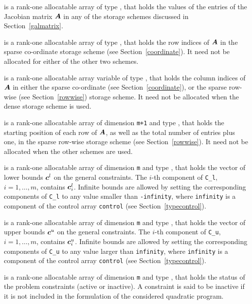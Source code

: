 \documentclass{galahad}
\begin{document}
\begin{description}
\begin{description}
 is a rank-one allocatable array of type \realdp, that holds
the values of the entries of the Jacobian matrix ${\bm{A}}$ in any of the
storage schemes discussed in Section~\ref{galmatrix}.

 is a rank-one allocatable array of type \integer,
that holds the row indices of ${\bm{A}}$ in the sparse co-ordinate storage
scheme (see Section~\ref{coordinate}).
It need not be allocated for either of the other two schemes.

 is a rank-one allocatable array variable of type \integer,
that holds the column indices of ${\bm{A}}$ in either the sparse co-ordinate
(see Section~\ref{coordinate}), or the sparse row-wise
(see Section~\ref{rowwise}) storage scheme.
It need not be allocated when the dense storage scheme is used.

 is a rank-one allocatable array of dimension {\tt m+1} and type
\integer, that holds the
starting position of each row of ${\bm{A}}$, as well
as the total number of entries plus one, in the sparse row-wise storage
scheme (see Section~\ref{rowwise}). It need not be allocated when the
other schemes are used.

\end{description}

 is a rank-one allocatable array of dimension {\tt m} and type
\realdp, that holds the vector of lower bounds ${\bm{c}}^{l}$
on the general constraints. The $i$-th component of
{\tt C\_l}, $i = 1, \ldots , m$, contains ${\bm{c}}_{i}^{l}$.
Infinite bounds are allowed by setting the corresponding
components of {\tt C\_l} to any value smaller than {\tt -infinity},
where {\tt infinity} is a component of the control array {\tt control}
(see Section~\ref{typecontrol}).

 is a rank-one allocatable array of dimension {\tt m} and type
\realdp, that holds the vector of upper bounds ${\bm{c}}^{u}$
on the general constraints. The $i$-th component of
{\tt C\_u}, $i = 1,  \ldots ,  m$, contains ${\bm{c}}_{i}^{u}$.
Infinite bounds are allowed by setting the corresponding
components of {\tt C\_u} to any value larger than {\tt infinity},
where {\tt infinity} is a component of the control array {\tt control}
(see Section~\ref{typecontrol}).

 is a rank-one allocatable array of dimension {\tt m} and type
\integer, that holds the status of the problem constraints (active or
inactive). A constraint is said to be inactive if it is not included in the
formulation of the considered quadratic program.


\end{description}
\end{document}
